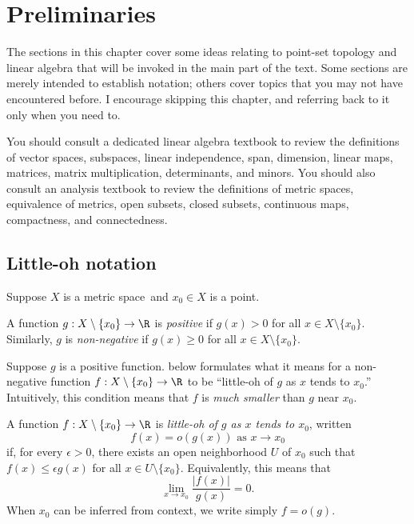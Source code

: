 \chapter{Preliminaries} \label{prerequisites}

The sections in this chapter cover some ideas relating to point-set topology and linear algebra that will be invoked in the main part of the text. Some sections are merely intended to establish notation; others cover topics that you may not have encountered before. I encourage skipping this chapter, and referring back to it only when you need to. 

You should consult a dedicated linear algebra textbook to review the definitions of vector spaces, subspaces, linear independence, span, dimension, linear maps, matrices, matrix multiplication, determinants, and minors. You should also consult an analysis textbook to review the definitions of metric spaces, equivalence of metrics, open subsets, closed subsets, continuous maps, compactness, and connectedness.

\section{Little-oh notation} \label{little-oh}

Suppose $X$ is a metric space\footnotemark\ and $x_0 \in X$ is a point. 


\begin{definition}
	A function $g : X \setminus \{x_0\} \to \R$ is \emph{positive} if $g(x) > 0$ for all $x \in X \setminus \{x_0\}$. Similarly, $g$ is \emph{non-negative} if $g(x) \geq 0$ for all $x \in X \setminus \{x_0\}$.
\end{definition}

Suppose $g$ is a positive function.  below formulates what it means for a non-negative function $f : X \setminus \{x_0\} \to \R$ to be ``little-oh of $g$ as $x$ tends to $x_0$.'' Intuitively, this condition means that $f$ is \emph{much smaller} than $g$ near $x_0$. 

\begin{definition} \label{little-o-definition}
	A function $f : X \setminus \{x_0\} \to \R$ is \emph{little-oh of $g$ as $x$ tends to $x_0$}, written \[ f(x) = o(g(x)) \text{ as } x \to x_0 \] 
	if, for every $\epsilon > 0$, there exists an open neighborhood $U$ of $x_0$ such that $f(x) \leq \epsilon g(x)$ for all $x \in U \setminus \{x_0\}$. Equivalently, this means that 
	\[ \lim_{x \to x_0} \frac{|f(x)|}{g(x)} = 0. \]
	When $x_0$ can be inferred from context, we write simply $f = o(g)$. 
\end{definition} 


